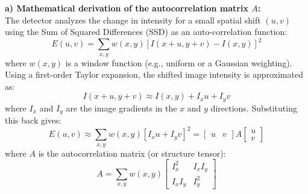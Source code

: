 
{
\textbf{a) Mathematical derivation of the autocorrelation matrix \texorpdfstring{$A$}{A}:}
\\
The detector analyzes the change in intensity for a small spatial shift $(u, v)$ using the Sum of Squared Differences (SSD) as an auto-correlation function:
$$E(u, v) = \sum_{x,y} w(x, y) [I(x+u, y+v) - I(x, y)]^2$$
where $w(x, y)$ is a window function (e.g., uniform or a Gaussian weighting).
Using a first-order Taylor expansion, the shifted image intensity is approximated as:
$$I(x+u, y+v) \approx I(x, y) + I_x u + I_y v$$
where $I_x$ and $I_y$ are the image gradients in the $x$ and $y$ directions. Substituting this back gives:
$$E(u, v) \approx \sum_{x,y} w(x, y) [I_x u + I_y v]^2 = \begin{bmatrix} u & v \end{bmatrix} A \begin{bmatrix} u \\ v \end{bmatrix}$$
where $A$ is the autocorrelation matrix (or structure tensor):
$$A = \sum_{x,y} w(x, y) \begin{bmatrix} I_x^2 & I_x I_y \\ I_x I_y & I_y^2 \end{bmatrix}$$

}
